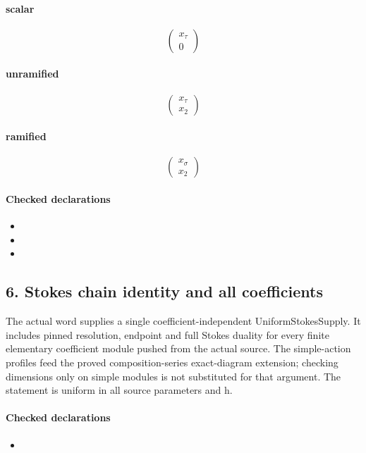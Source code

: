 \paragraph{scalar}
\[\begin{pmatrix}x_{\tau}\\0\end{pmatrix}\]
\paragraph{unramified}
\[\begin{pmatrix}x_{\tau}\\x_{2}\end{pmatrix}\]
\paragraph{ramified}
\[\begin{pmatrix}x_{\sigma}\\x_{2}\end{pmatrix}\]
\paragraph{Checked declarations}
\begin{itemize}
\item {}
\item {}
\item {}
\end{itemize}

\subsection*{6. Stokes chain identity and all coefficients}
The actual word supplies a single coefficient-independent UniformStokesSupply. It includes pinned resolution, endpoint and full Stokes duality for every finite elementary coefficient module pushed from the actual source. The simple-action profiles feed the proved composition-series exact-diagram extension; checking dimensions only on simple modules is not substituted for that argument. The statement is uniform in all source parameters and h.

\paragraph{Checked declarations}
\begin{itemize}
\item {}
\end{itemize}

